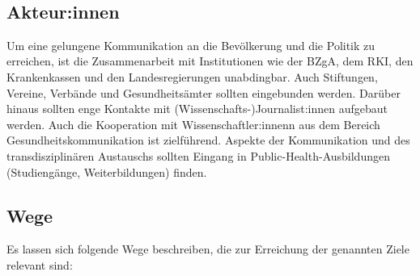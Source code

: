 \documentclass{article}
\begin{document}
 


\subsection{Akteur:innen}\label{H1642828}



Um eine gelungene Kommunikation an die Bevölkerung und die Politik zu erreichen, ist die Zusammenarbeit mit Institutionen wie der BZgA, dem RKI, den Krankenkassen und den Landesregierungen unabdingbar. Auch Stiftungen, Vereine, Verbände und Gesundheitsämter sollten eingebunden werden. Darüber hinaus sollten enge Kontakte mit (Wissenschafts-)Journalist:innen aufgebaut werden. Auch die Kooperation mit Wissenschaftler:innenn aus dem Bereich Gesundheitskommunikation ist zielführend. Aspekte der Kommunikation und des transdisziplinären Austauschs sollten Eingang in Public-Health-Ausbildungen (Studiengänge, Weiterbildungen) finden. 


\subsection{Wege}\label{H7462476}



Es lassen sich folgende Wege beschreiben, die zur Erreichung der genannten Ziele relevant sind:
\end{document}
